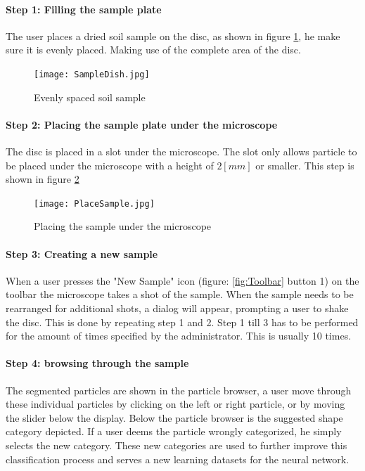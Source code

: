 \documentclass[11pt,fleqn,,a4paper,twoside,openright]{book}
\begin{document}
\paragraph{Step 1: Filling the sample plate}
The user places a dried soil sample on the disc, as shown in figure \ref{fig:SampleDish}, he make sure it is evenly placed. Making use of the complete area of the disc. 
\begin{figure}[H]
	\centering
	\texttt{[image: SampleDish.jpg]}
	\caption{Evenly spaced soil sample}\label{fig:SampleDish}
\end{figure}

\newpage
\paragraph{Step 2: Placing the sample plate under the microscope}
The disc is placed in a slot under the microscope. The slot only allows particle to be placed under the microscope  with a height of $ 2 [mm] $ or smaller. This step is shown in figure \ref{fig:PlacementSample}
\begin{figure}[H]
	\centering
	\texttt{[image: PlaceSample.jpg]}
	\caption{Placing the sample under the microscope}\label{fig:PlacementSample}
\end{figure}

\paragraph{Step 3: Creating a new sample}
When a user presses the "New Sample" icon (figure: \ref{fig:Toolbar} button 1) on the toolbar the microscope takes a shot of the sample. When the sample needs to be rearranged for additional shots, a dialog will appear, prompting a user to shake the disc. This is done by repeating step 1 and 2. Step 1 till 3 has to be performed for the amount of times specified by the administrator. This is usually 10 times.

\paragraph{Step 4: browsing through the sample}
The segmented particles are shown in the particle browser, a user move through these individual particles by clicking on the left or right particle, or by moving the slider below the display. Below the particle browser is the suggested shape category depicted. If a user deems the particle wrongly categorized, he simply selects the new category. These new categories are used to further improve this classification process and serves a new learning datasets for the neural network.
\end{document}
